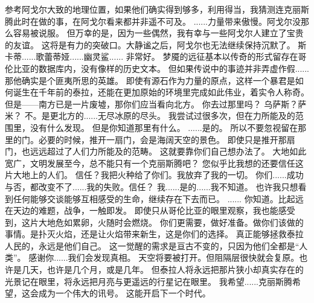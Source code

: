 \documentclass[openany]{book}
\begin{document}
\begin{dialogue}
     参考阿戈尔大致的地理位置，如果他们确实得到够多，利用得当，我猜测连克丽斯腾此时在做的事，在阿戈尔看来都并非遥不可及。
     ......力量带来傲慢。阿戈尔没那么容易被说服。
     但万幸的是，因为一些偶然，我有幸与一些阿戈尔人建立了宝贵的友谊。
     这将是有力的突破口。大静谧之后，阿戈尔也无法继续保持沉默了。
     斯卡蒂......歌蕾蒂娅......幽灵鲨......
     非常好。
     梦魇的远征基本以传奇的形式留存在哥伦比亚的数据库内，没有像样的历史文本。
     但如果传说中的事迹并非弄虚作假......那他确实是个匪夷所思的英雄。
     即使有源石作为力量的原点，这样一个暴君是如何诞生在千年前的泰拉，还能在更加原始的环境里完成如此伟业，着实令人称奇。
     但是——南方已是一片废墟，那你们应当看向北方。
     你去过那里吗？
     乌萨斯？萨米？
     不。是更北方的......无尽冰原的尽头。
     我尝试过很多次，但在力所能及的范围里，没有什么发现。
     但是你知道那里有什么。
     ......是的。
     所以不要忽视留在那里的门。必要的时候，推开一扇门，会是海阔天空的景色。
     即使只是推开那扇门，也远远超过了人们力所能及的范畴。
     这就要靠你们自己想办法了。
     大地如此宽广，文明发展至今，总不能只有一个克丽斯腾吧？
     您似乎比我想的还要信任这片大地上的人们。
     信任？我把火种给了你们。我放弃了我的一切。
     你们......成功与否，都改变不了......我的失败。信任？
     我......是的......我不知道。
     也许我只想看到任何能够交谈能够互相感受的生命，继续存在下去而已。
     ......
     你知道。比起远在天边的难题，战争，一触即发。
     即使只从哥伦比亚的眼里观察，我也能感受到，这片大地危如累卵，火随时会燃烧。
     你们更需要，做好准备。做你们该做的事情。是扑灭火焰，还是让火焰带来新生，这是你们的选择。
     真正能够拯救泰拉人民的，永远是他们自己。
     这一觉醒的需求是亘古不变的，只因为他们全都是“人类”。
     感谢你......我们会发现真相。
     天空将要被打开。但阻隔层很快就会复原。也许是几天，也许是几个月，或是几年。
     但泰拉人将永远把那片狭小却真实存在的光景记在眼里，将永远把月亮与更遥远的行星记在眼里。
     我希望......克丽斯腾希望，这会成为一个伟大的讯号。
     这能开启下一个时代。
\end{dialogue}
\end{document}
